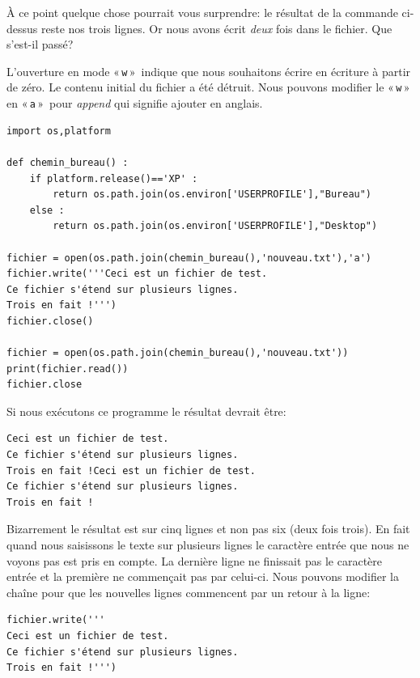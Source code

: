 À ce point quelque chose pourrait vous surprendre: le résultat de la commande ci-dessus reste nos trois lignes. Or nous avons écrit \emph{deux} fois dans le fichier. Que s'est-il passé?

L'ouverture en mode « \texttt{w} »  indique que nous souhaitons écrire en écriture à partir de zéro. Le contenu initial du fichier a été détruit. Nous pouvons modifier le « \texttt{w} »  en « \texttt{a} »  pour \emph{append} qui signifie ajouter en anglais.

\begin{Verbatim}[frame=single,rulecolor=\color{mbleu}, label=à taper par exemple en reprenant l'existant]
import os,platform

def chemin_bureau() :
    if platform.release()=='XP' :
        return os.path.join(os.environ['USERPROFILE'],"Bureau")
    else :
        return os.path.join(os.environ['USERPROFILE'],"Desktop")
    
fichier = open(os.path.join(chemin_bureau(),'nouveau.txt'),'a')
fichier.write('''Ceci est un fichier de test.
Ce fichier s'étend sur plusieurs lignes.
Trois en fait !''')
fichier.close()

fichier = open(os.path.join(chemin_bureau(),'nouveau.txt'))
print(fichier.read())
fichier.close
\end{Verbatim}

Si nous exécutons ce programme le résultat devrait être:

\begin{Verbatim}[frame=single,rulecolor=\color{gray}, label=résultat en mode ajout]
Ceci est un fichier de test.
Ce fichier s'étend sur plusieurs lignes.
Trois en fait !Ceci est un fichier de test.
Ce fichier s'étend sur plusieurs lignes.
Trois en fait !
\end{Verbatim}

Bizarrement le résultat est sur cinq lignes et non pas six (deux fois trois). En fait quand nous saisissons le texte sur plusieurs lignes le caractère entrée que nous ne voyons pas est pris en compte. La dernière ligne ne finissait pas le caractère entrée et la première ne commençait pas par celui-ci.
Nous pouvons modifier la chaîne pour que les nouvelles lignes commencent par un retour à la ligne:

\begin{Verbatim}[frame=single,rulecolor=\color{mbleu}, label=à taper]
fichier.write('''
Ceci est un fichier de test.
Ce fichier s'étend sur plusieurs lignes.
Trois en fait !''')
\end{Verbatim}

